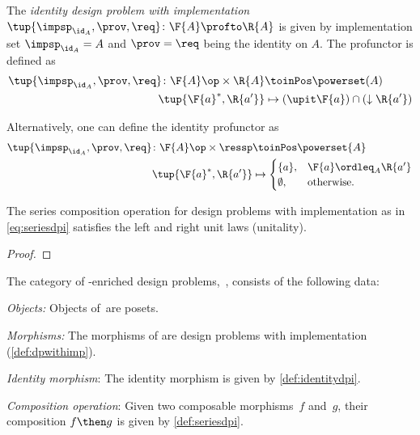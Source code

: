 {    \begin{definition}
        \label{def:identitydpi}
        The \emph{identity design problem with implementation}~$\tup{\impsp_{\id_A},\prov,\req} \colon \F{A} \profto \R{A}$ is given by implementation set $\impsp_{\id_A} = A$ and $\prov=\req$ being
        the identity on $A$.
        The profunctor is defined as
        \begin{align}
            \tup{\impsp_{\id_A},\prov,\req} \colon \F{A}\op \times \R{A} &\toinPos \powerset(A) \\
            \tup{\F{a}^*,\R{a'}} &\mapsto (\upit \F{a}) \cap (\downarrow \R{a'})
        \end{align}
    \end{definition}
    \begin{remark}
        Alternatively, one can define the identity profunctor as
        \begin{align}
            \tup{\impsp_{\id_A},\prov,\req}\colon \F{A}\op \times \ressp &\toinPos \powerset{A}\\
            \tup{\F{a}^*,\R{a'}}&\mapsto
            \begin{cases}
                \{a\},&\F{a}\ordleq_A \R{a'}\\
                \emptyset, &\text{otherwise}.
            \end{cases}
        \end{align}
    \end{remark}

    \begin{lemma}
        The series composition operation for design problems with implementation as in \cref{eq:seriesdpi} satisfies the left and right unit laws (unitality).
    \end{lemma}

    \begin{proof}
    \end{proof}


    \begin{definition}
        The category of \Set-enriched design problems,~\DPI, consists of the following data:
        \begin{compactenum}
            \item \emph{Objects:}  Objects of~\DPI are posets.
            \item \emph{Morphisms:} The morphisms of \DPI are design problems with implementation (\cref{def:dpwithimp}).
            \item \emph{Identity morphism}: The identity morphism is given by \cref{def:identitydpi}.
            \item \emph{Composition operation}: Given two composable morphisms~$f$ and~$g$, their composition $f\then g$ is given by \cref{def:seriesdpi}.
        \end{compactenum}
    \end{definition}

}
